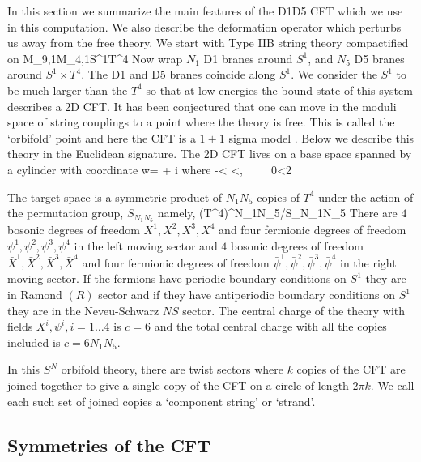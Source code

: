 \documentclass[11pt]{article}
\begin{document}
In this section we summarize the main features of the D1D5 CFT which we use in this computation. We also describe the deformation operator which perturbs us away from the free theory. We start with Type IIB string theory compactified on
\bea
M_{9,1}\to M_{4,1}\times S^1\times T^4
\eea
Now wrap $N_1$ D1 branes around $S^1$, and $N_5$ D5 branes around $S^1\times T^4$. The D1 and D5 branes coincide along $S^1$. We consider the $S^1$ to be much larger than the $T^4$ so that at low energies the bound state of this system describes a 2D CFT. 
It has been conjectured that one can move in the moduli space of string couplings to a point where the theory is free. This is called the `orbifold' point and here the CFT is a $1+1$ sigma model \cite{orbifold2}. Below we describe this theory in the Euclidean signature. The 2D CFT lives on a base space spanned by a cylinder with coordinate
\bea
w= \tau + i\sigma
\label{w}
\eea 
where
\bea
-\infty < \tau <\infty,~~~~~0\leq \sigma <2\pi
\label{tau}
\eea

The target space is a symmetric product of $N_1N_5$ copies of $T^4$ under the action of the permutation group, $S_{N_1N_5}$ namely, 
\be
(T^4)^{N_1N_5}/S_{N_1N_5}
\ee
There are $4$ bosonic degrees of freedom $X^1,X^2,X^3,X^4$ and four fermionic degrees of freedom $\psi^1,\psi^2,\psi^3,\psi^4$ in the left moving sector and $4$ bosonic degrees of freedom $\bar X^1,\bar X^2,\bar X^3,\bar X^4$ and four fermionic degrees of freedom $\bar \psi^1,\bar \psi^2,\bar \psi^3,\bar \psi^4$ in the right moving sector. If the fermions have periodic boundary conditions on $S^1$ they are in Ramond $(R)$ sector and if they have antiperiodic boundary conditions on $S^1$ they are in the Neveu-Schwarz $NS$ sector. The central charge of the theory with fields $X^i,\psi^i, i =1 \ldots 4$ is $c=6$ and the total central charge with all the copies included is $ c= 6N_1N_5 $.

In this $S^N$ orbifold theory, there are twist sectors where $k$ copies of the CFT are joined together to give a single copy of the CFT on a circle of length $2\pi k$. We call each such set of joined copies a `component string' or `strand'.

\subsection{Symmetries of the CFT}
\end{document}

